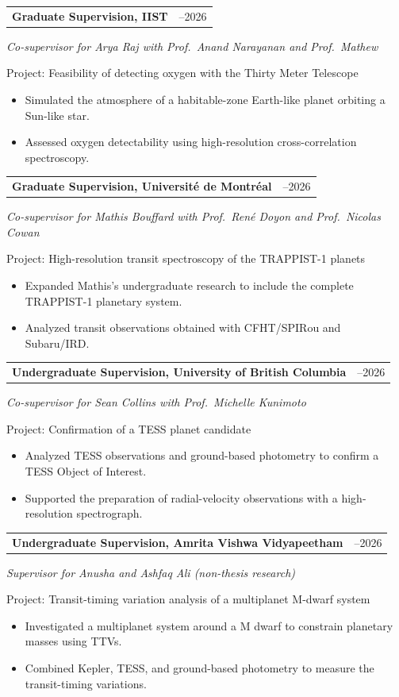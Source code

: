 \documentclass[10pt,a4paper]{article}
\makeatletter
\newcommand{\grantheading}[2]{%
\begin{tabularx}{\textwidth}{
    @{}
    >{\raggedright\arraybackslash}X
    >{\raggedleft\arraybackslash}p{4.5cm}
    @{}
}
\textbf{#1} & #2
\end{tabularx}
}
\newenvironment{lightitems}
{%
  \begin{itemize}[
      label=\textcolor{entrylight}{\textbullet},
      leftmargin=1.3em,
      itemsep=1pt,
      topsep=2pt,
      parsep=0pt
  ]
  \color{entrylight}
}
{%
  \end{itemize}
}
\makeatother
\begin{document}
\grantheading
{Graduate Supervision, IIST}
{2025--2026}
\emph{Co-supervisor for Arya Raj with Prof.\ Anand Narayanan and Prof.\ Mathew}

Project: Feasibility of detecting oxygen with the Thirty Meter Telescope
\begin{lightitems}
\item
\vspace{-1.5mm}Simulated the atmosphere of a habitable-zone Earth-like planet orbiting
a Sun-like star.
\item
Assessed oxygen detectability using high-resolution cross-correlation
spectroscopy.
\end{lightitems}


\grantheading
{Graduate Supervision, Université de Montréal}
{2024--2026}
\emph{Co-supervisor for Mathis Bouffard with Prof.\ René Doyon and
Prof.\ Nicolas Cowan}

Project: High-resolution transit spectroscopy of the TRAPPIST-1 planets
\begin{lightitems}
\item
\vspace{-1.5mm}Expanded Mathis's undergraduate research to include the
complete TRAPPIST-1 planetary system.
\item
Analyzed transit observations obtained with CFHT/SPIRou and Subaru/IRD.
\end{lightitems}


\grantheading
{Undergraduate Supervision, University of British Columbia}
{2025--2026}
\emph{Co-supervisor for Sean Collins with Prof.\ Michelle Kunimoto}

Project: Confirmation of a TESS planet candidate
\begin{lightitems}
\item
\vspace{-1.5mm}Analyzed TESS observations and ground-based photometry to confirm a
TESS Object of Interest.
\item
Supported the preparation of radial-velocity observations with a
high-resolution spectrograph.
\end{lightitems}


\grantheading
{Undergraduate Supervision, Amrita Vishwa Vidyapeetham}
{2024--2026}
\emph{Supervisor for Anusha and Ashfaq Ali (non-thesis research)}

Project: Transit-timing variation analysis of a multiplanet M-dwarf system
\begin{lightitems}
\item
\vspace{-1.5mm}Investigated a multiplanet system around a M dwarf to constrain
planetary masses using TTVs.
\item
Combined Kepler, TESS, and ground-based photometry to measure the
transit-timing variations.
\end{lightitems}
\end{document}
